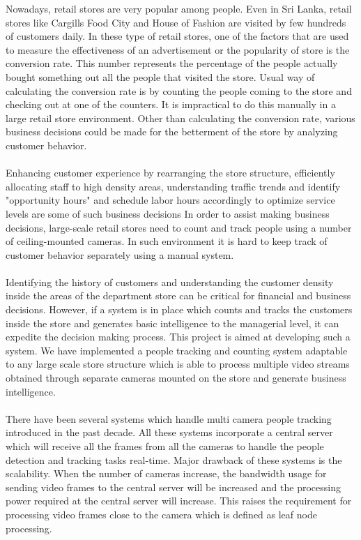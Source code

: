\documentclass[12pt,a4paper]{report}
\begin{document}
Nowadays, retail stores are very popular among people. Even in Sri Lanka, retail stores like Cargills Food City and House of Fashion are visited by few hundreds of customers daily. In these type of retail stores, one of the factors that are used to measure the effectiveness of an advertisement or the popularity of store is the conversion rate. This number represents the percentage of the people actually bought something out all the people that visited the store. Usual way of calculating the conversion rate is by counting the people coming to the store and checking out at one of the counters. It is impractical to do this manually in a large retail store environment. Other than calculating the conversion rate, various business decisions could be made for the betterment of the store by analyzing customer behavior. \\\\
Enhancing customer experience by rearranging the store structure, efficiently allocating staff to high density areas, understanding traffic trends and identify "opportunity hours" and schedule labor hours accordingly to optimize service levels are some of such business decisions In order to assist making business decisions, large-scale retail stores need to count and track people using a number of ceiling-mounted cameras. In such environment it is hard to keep track of customer behavior separately using a manual system.\\\\
Identifying the history of  customers and understanding the customer density inside the areas of the department store can be critical for financial and business decisions. However, if a system is in place which counts and tracks the customers inside the store and generates basic intelligence to the managerial level, it can expedite the decision making process. This project is aimed at developing such a system. We have implemented a people tracking and counting system adaptable to any large scale store structure which is able to process multiple video streams obtained through separate cameras mounted on the store and generate business intelligence.\\\\
There have been several systems which handle multi camera people tracking introduced in the past decade. All these systems incorporate a central server which will receive all the frames from all the cameras to handle the people detection and tracking tasks real-time. Major drawback of these systems is the scalability. When the number of cameras increase, the bandwidth usage for sending video frames to the central server will be increased and the processing power required at the central server will increase. This raises the requirement for processing video frames close to the camera which is defined as leaf node processing. \\\\
\end{document}
